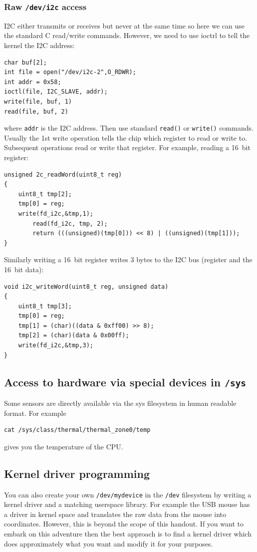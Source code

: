 \documentclass[12pt]{report}
\begin{document}
\subsubsection{Raw \texttt{/dev/i2c} access}
I2C either transmits or receives but never at the same time so here we
can use the standard C read/write commands. However, we need to use ioctrl to tell
the kernel the I2C address:
\begin{verbatim}
char buf[2];
int file = open("/dev/i2c-2",O_RDWR);
int addr = 0x58;
ioctl(file, I2C_SLAVE, addr);
write(file, buf, 1)
read(file, buf, 2)
\end{verbatim}
where \texttt{addr} is the I2C address. Then use standard \texttt{read()}
or \texttt{write()} commands. Usually the 1st write operation tells the chip
which register to read or write to. Subsequent operations read
or write that register. For example, reading a 16~bit register:
\begin{verbatim}
unsigned 2c_readWord(uint8_t reg)
{
	uint8_t tmp[2];
	tmp[0] = reg;
	write(fd_i2c,&tmp,1);
        read(fd_i2c, tmp, 2);
        return (((unsigned)(tmp[0])) << 8) | ((unsigned)(tmp[1]));
}
\end{verbatim}
Similarly writing a 16~bit register writes 3 bytes to the I2C bus (register and the 16~bit data):
\begin{verbatim}
void i2c_writeWord(uint8_t reg, unsigned data)
{
	uint8_t tmp[3];
	tmp[0] = reg;
	tmp[1] = (char)((data & 0xff00) >> 8);
	tmp[2] = (char)(data & 0x00ff);
	write(fd_i2c,&tmp,3);
}
\end{verbatim}


\subsection{Access to hardware via special devices in \texttt{/sys}}
Some sensors are directly available via the sys filesystem in human readable format.
For example
\begin{verbatim}
cat /sys/class/thermal/thermal_zone0/temp
\end{verbatim}
gives you the temperature of the CPU.



\subsection{Kernel driver programming}
You can also create your own \texttt{/dev/mydevice} in the \texttt{/dev} filesystem
by writing a kernel driver and a matching userspace library. For
example the USB mouse has a driver in kernel space and translates
the raw data from the mouse into coordinates. However,
this is beyond the scope of this handout. If you want to embark
on this adventure then the best approach is to
find a kernel driver which does approximately what you want and
modify it for your purposes.
\end{document}
